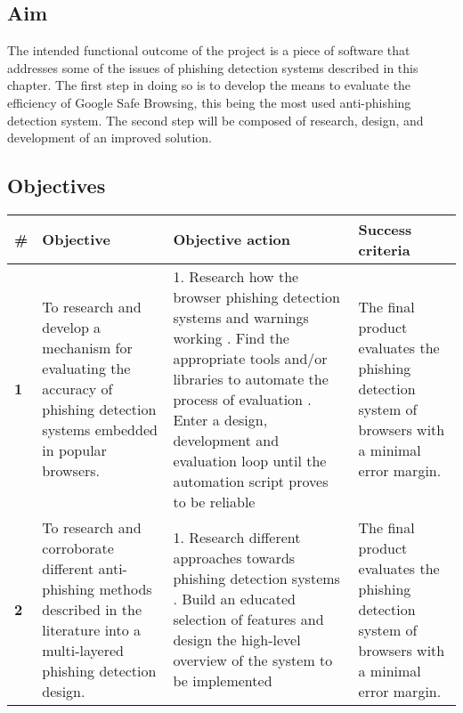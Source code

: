\subsection{Aim}
The intended functional outcome of the project is a piece of software that addresses some of the issues of phishing detection systems described in this chapter. The first step in doing so is to develop the means to evaluate the efficiency of Google Safe Browsing, this being the most used anti-phishing detection system. The second step will be composed of research, design, and development of an improved solution.

\begin{landscape}
	\begin{singlespace}
		\subsection{Objectives}
		\begin{center}
			\label{tab:OBJECTIVES}
			\begin{tabular}{ | m{0.5em} | m{18.5em} | m{23em}| m{16em} | }
				\hline
				\textbf{\#} & \textbf{Objective} & \textbf{Objective action} & \textbf{Success criteria}           \\
				\hline
				\textbf{1}  &
				To research and develop a mechanism for evaluating the accuracy of phishing detection systems embedded in popular browsers.
				            &
				1. Research how the browser phishing detection systems and warnings working \newline\newline
				2. Find the appropriate tools and/or libraries to automate the process of evaluation
				\newline\newline
				2. Enter a design, development and evaluation loop until the automation script proves to be reliable
				            &
				The final product evaluates the phishing detection system of browsers with a minimal error margin. \\


				\hline
				\textbf{2}  &
				To  research and corroborate different anti-phishing methods described in the literature into a multi-layered phishing detection design.
				            &
				1. Research different approaches towards phishing detection systems \newline\newline
				2. Build an educated selection of features and design the high-level overview of the system to be implemented
				            &
				The final product evaluates the phishing detection system of browsers with a minimal error margin. \\



\end{tabular}
\end{center}
\end{singlespace}
\end{landscape}
